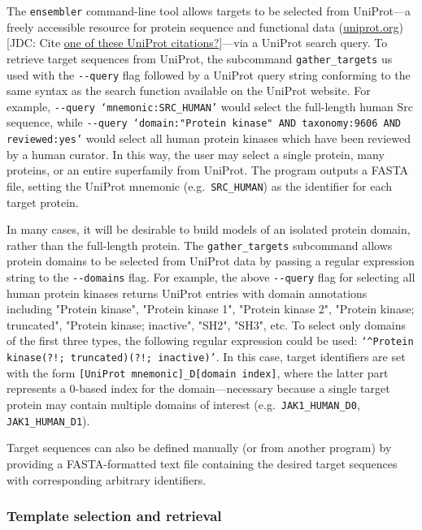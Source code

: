 \documentclass[aps,pre,twocolumn,nofootinbib,superscriptaddress,linenumbers]{revtex4-1}
\begin{document}
The {\tt ensembler} command-line tool allows targets to be selected from UniProt---a freely accessible resource for protein sequence and functional data (\href{http://www.uniprot.org/}{uniprot.org}) {\color{red}[JDC: Cite \href{http://www.uniprot.org/help/publications}{one of these UniProt citations?}]}---via a UniProt search query.
To retrieve target sequences from UniProt, the subcommand {\tt gather\_targets} us used with the {\tt -{}-query} flag followed by a UniProt query string conforming to the same syntax as the search function available on the UniProt website.
For example, {\tt -{}-query `mnemonic:SRC\_HUMAN'} would select the full-length human Src sequence, while {\tt -{}-query `domain:"Protein kinase" AND taxonomy:9606 AND reviewed:yes'} would select all human protein kinases which have been reviewed by a human curator.
In this way, the user may select a single protein, many proteins, or an entire superfamily from UniProt.
The program outputs a FASTA file, setting the UniProt mnemonic (e.g.~{\tt SRC\_HUMAN}) as the identifier for each target protein.

In many cases, it will be desirable to build models of an isolated protein domain, rather than the full-length protein.
The {\tt gather\_targets} subcommand allows protein domains to be selected from UniProt data by passing a regular expression string to the {\tt -{}-domains} flag. 
For example, the above {\tt -{}-query} flag for selecting all human protein kinases returns UniProt entries with domain annotations including "Protein kinase", "Protein kinase 1", "Protein kinase 2", "Protein kinase; truncated", "Protein kinase; inactive", "SH2", "SH3", etc.
To select only domains of the first three types, the following regular expression could be used: {\tt`\^{}Protein kinase(?!; truncated)(?!; inactive)'}.
In this case, target identifiers are set with the form {\tt [UniProt mnemonic]\_D[domain index]}, where the latter part represents a 0-based index for the domain---necessary because a single target protein may contain multiple domains of interest (e.g.~{\tt JAK1\_HUMAN\_D0}, {\tt JAK1\_HUMAN\_D1}).

Target sequences can also be defined manually (or from another program) by providing a FASTA-formatted text file containing the desired target sequences with corresponding arbitrary identifiers.

\subsubsection*{Template selection and retrieval}
\end{document}
